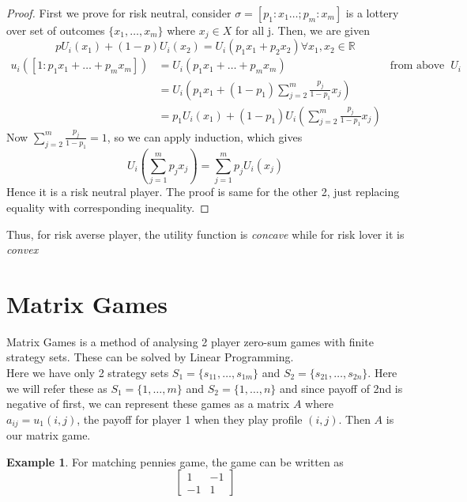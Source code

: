 \documentclass{article}
\theoremstyle{definition}
\newtheorem{example}{Example}[section]
\begin{document}
\begin{proof}
First we prove for risk neutral, consider $\sigma = [p_1:x_1\dots; p_m:x_m]$ is a lottery over set of outcomes $\{x_1,\dots, x_m\}$ where $x_j\in X$ for all j. Then, we are given $$pU_i(x_1) + (1-p)U_i(x_2) = U_i(p_1x_1 + p_2x_2) \forall x_1,x_2\in \mathbb{R}$$
\begin{align*}
u_i([1:p_1x_1 + \dots + p_mx_m]) &= U_i(p_1x_1 + \dots + p_mx_m) & \text{from above definition of } U_i\\
&= U_i\left(p_1x_1 + (1-p_1)\sum_{j=2}^m \frac{p_j}{1-p_1}x_j\right)\\
&= p_1U_i(x_1) + (1-p_1)U_i\left(\sum_{j=2}^m \frac{p_j}{1-p_1}x_j\right)
\end{align*}
Now $\sum_{j=2}^m \frac{p_j}{1-p_1} = 1$, so we can apply induction, which gives $$U_i\left(\sum_{j=1}^m p_jx_j\right) = \sum_{j=1}^m p_j U_i(x_j)$$ Hence it is a risk neutral player. The proof is same for the other 2, just replacing equality with corresponding inequality.
\end{proof}
Thus, for risk averse player, the utility function is \textit{concave} while for risk lover it is \textit{convex}
\section{Matrix Games}
Matrix Games is a method of analysing 2 player zero-sum games with finite strategy sets. These can be solved by Linear Programming.\\
Here we have only 2 strategy sets $S_1 = \{s_{11},\dots,s_{1m}\}$ and $S_2 = \{s_{21},\dots,s_{2n}\}$. Here we will refer these as $S_1 = \{1,\dots,m\}$ and $S_2 = \{1,\dots,n\}$ and since payoff of 2nd is negative of first, we can represent these games as a matrix $A$ where $a_{ij} = u_1(i,j)$, the payoff for player 1 when they play profile $(i,j)$. Then $A$ is our matrix game.\\
\begin{example} 
For matching pennies game, the game can be written as
$$
\begin{bmatrix}
1 & -1\\
-1 & 1
\end{bmatrix}
$$
\end{example}
\end{document}
